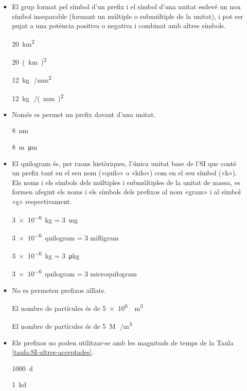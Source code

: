 \begin{itemize}
\item El grup format pel símbol d'un prefix i el símbol d'una unitat
esdevé un nou símbol inseparable (formant un múltiple o submúltiple
de la unitat), i pot ser pujat a una potència positiva o negativa i
combinat amb altres símbols.

\textcolor{Green}\faCheckSquare{} \qty{20}{km^2}

\textcolor{Red}\faTimesCircle{} \qty{20}{(km)^2}

\textcolor{Green}\faCheckSquare{}  \qty{12}{kg\,/mm^2}

\textcolor{Red}\faTimesCircle{}  \qty{12}{kg\,/(mm)^2}


\item Només es permet un prefix davant d'una unitat.

\textcolor{Green}\faCheckSquare{} \qty{8}{nm}

\textcolor{Red}\faTimesCircle{} \qty{8}{m\micro m}


\item El quilogram és, per raons històriques, l'única unitat base de l'SI que conté un prefix tant en el seu nom («quilo» o «kilo») com en el seu símbol («k»). Els noms i els símbols dels múltiples i submúltiples de la unitat de massa, es formen afegint els noms i els símbols dels prefixos al nom «gram» i al símbol «g» respectivament.

\textcolor{Green}\faCheckSquare{} \qty{3e-6}{kg} = \qty{3}{mg}

\textcolor{Green}\faCheckSquare{} \qty{3e-6}{quilogram} = 3 miŀligram

\textcolor{Red}\faTimesCircle{} \qty{3e-6}{kg} = \qty{3}{\micro kg}

\textcolor{Red}\faTimesCircle{} \qty{3e-6}{quilogram} = 3 microquilogram

\item No es permeten prefixos aïllats.

\textcolor{Green}\faCheckSquare{} El nombre de partícules és de \qty[per-mode = symbol]{5e6}{\per\cubic\metre}

\textcolor{Red}\faTimesCircle{} El nombre de partícules és de \qty{5}{M\,/m^3}


\item Els prefixos no poden utilitzar-se amb les magnituds  de temps de la Taula \vref{taula:SI-altres-acceptades}.

\textcolor{Green}\faCheckSquare{} \qty{1000}{d}

\textcolor{Red}\faTimesCircle{}  \qty{1}{kd}


\end{itemize}
